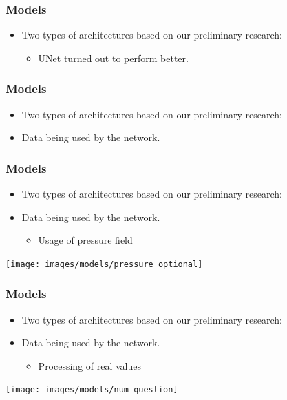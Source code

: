 \documentclass[18pt]{beamer}
\begin{document}
\begin{frame}[t]
  \frametitle{Models}
  \begin{itemize}
  \item Two types of architectures based on our preliminary research:
    \begin{itemize}
    \item UNet turned out to perform better.
    \end{itemize}
  \end{itemize}
\end{frame}


\begin{frame}[t]
  \frametitle{Models}
  \begin{itemize}
  \item Two types of architectures based on our preliminary research:
  \item Data being used by the network.
  \end{itemize}
\end{frame}

\begin{frame}[t]
  \frametitle{Models}
  \begin{itemize}
  \item Two types of architectures based on our preliminary research:
  \item Data being used by the network.
    \begin{itemize}
    \item Usage of pressure field
    \end{itemize}
  \end{itemize}

  \vspace{0.5cm}
  \begin{center}
    \texttt{[image: images/models/pressure\_optional]}
  \end{center}
  
\end{frame}

\begin{frame}[t]
  \frametitle{Models}
  \begin{itemize}
  \item Two types of architectures based on our preliminary research:
  \item Data being used by the network.
    \begin{itemize}
    \item Processing of real values
    \end{itemize}
  \end{itemize}

  \vspace{0.5cm}
    \begin{center}
    \texttt{[image: images/models/num\_question]}
  \end{center}
\end{frame}
\end{document}

